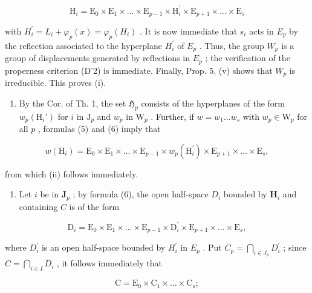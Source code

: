 \[
\mathrm{H} _ {i} = \mathrm{E} _ {0} \times \mathrm{E} _ {1} \times \dots \times \mathrm{E} _ {p - 1} \times \mathrm{H} _ {i} ^ {\prime} \times \mathrm{E} _ {p + 1} \times \dots \times \mathrm{E} _ {s}\tag{6}
\]

with \(H_{i}^{\prime}=L_{i}+\varphi_{p}(x)=\varphi_{p}(H_{i})\) . It is now immediate that \(s_{i}\) acts in \(E_{p}\) by the reflection associated to the hyperplane \(H_{i}^{\prime}\) of \(E_{p}\) . Thus, the group \(W_{p}\) is a group of displacements generated by reflections in \(E_{p}\) ; the verification of the properness criterion (D'2) is immediate. Finally, Prop. 5, (v) shows that \(W_{p}\) is irreducible. This proves (i).

\begin{enumerate}
\def\labelenumi{(\roman{enumi})}
\setcounter{enumi}{1}
\tightlist
\item
  By the Cor. of Th. 1, the set \(\mathfrak{H}_p\) consists of the hyperplanes of the form \(w_p(\mathrm{H}_i')\) for \(i\) in \(\mathrm{J}_p\) and \(w_p\) in \(\mathrm{W}_p\) . Further, if \(w = w_1 \ldots w_s\) with \(w_p \in \mathrm{W}_p\) for all \(p\) , formulas (5) and (6) imply that
\end{enumerate}

\[
w (\mathrm{H} _ {i}) = \mathrm{E} _ {0} \times \mathrm{E} _ {1} \times \dots \times \mathrm{E} _ {p - 1} \times w _ {p} (\mathrm{H} _ {i} ^ {\prime}) \times \mathrm{E} _ {p + 1} \times \dots \times \mathrm{E} _ {s},\tag{7}
\]

from which (ii) follows immediately.

\begin{enumerate}
\def\labelenumi{(\roman{enumi})}
\setcounter{enumi}{2}
\tightlist
\item
  Let \(i\) be in \(\mathbf{J}_p\) ; by formula (6), the open half-space \(D_i\) bounded by \(\mathbf{H}_i\) and containing \(C\) is of the form
\end{enumerate}

\[
\mathrm{D} _ {i} = \mathrm{E} _ {0} \times \mathrm{E} _ {1} \times \dots \times \mathrm{E} _ {p - 1} \times \mathrm{D} _ {i} ^ {\prime} \times \mathrm{E} _ {p + 1} \times \dots \times \mathrm{E} _ {s},
\]

where \(D_{i}^{\prime}\) is an open half-space bounded by \(H_{i}^{\prime}\) in \(E_{p}\) . Put \(C_{p} = \bigcap_{i \in J_{p}} D_{i}^{\prime}\) ; since \(C = \bigcap_{i \in I} D_{i}\) , it follows immediately that

\[
\mathrm{C} = \mathrm{E} _ {0} \times \mathrm{C} _ {1} \times \dots \times \mathrm{C} _ {s};
\]


